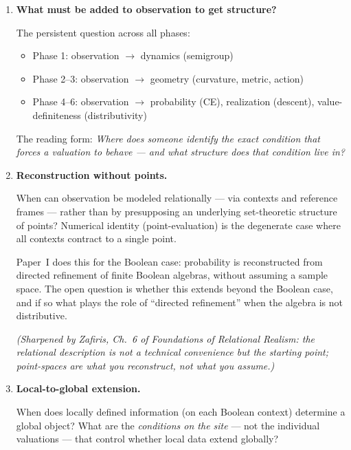 \begin{enumerate}
  \item \textbf{What must be added to observation to get structure?}

    The persistent question across all phases:
    \begin{itemize}[nosep]
      \item Phase 1: observation $\to$ dynamics (semigroup)
      \item Phase 2--3: observation $\to$ geometry
        (curvature, metric, action)
      \item Phase 4--6: observation $\to$ probability (CE),
        realization (descent), value-definiteness (distributivity)
    \end{itemize}

    \smallskip\noindent
    The reading form: \emph{Where does someone identify the exact
    condition that forces a valuation to behave --- and what
    structure does that condition live in?}

  \item \textbf{Reconstruction without points.}

    When can observation be modeled relationally --- via contexts
    and reference frames --- rather than by presupposing an
    underlying set-theoretic structure of points?  Numerical
    identity (point-evaluation) is the degenerate case where all
    contexts contract to a single point.

    \smallskip\noindent
    Paper~I does this for the Boolean case: probability is
    reconstructed from directed refinement of finite Boolean
    algebras, without assuming a sample space.  The open question
    is whether this extends beyond the Boolean case, and if so
    what plays the role of ``directed refinement'' when the
    algebra is not distributive.

    \smallskip\noindent
    \emph{(Sharpened by Zafiris, Ch.~6 of Foundations of
    Relational Realism: the relational description is not a
    technical convenience but the starting point; point-spaces
    are what you reconstruct, not what you assume.)}

  \item \textbf{Local-to-global extension.}

    When does locally defined information (on each Boolean context)
    determine a global object?  What are the \emph{conditions on
    the site} --- not the individual valuations --- that control
    whether local data extend globally?


\end{enumerate}
